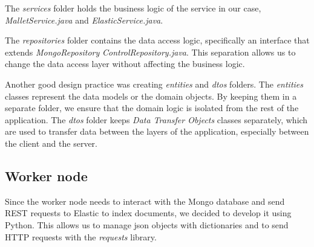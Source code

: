 The \textit{services} folder holds the business logic of the service in our case, \textit{MalletService.java} and \textit{ElasticService.java}.

The \textit{repositories} folder contains the data access logic, specifically an interface that extends
\textit{MongoRepository} \textit{ControlRepository.java}. This separation allows us to change the data access layer
without affecting the business logic.

Another good design practice was creating \textit{entities} and \textit{dtos} folders. The \textit{entities} classes
represent the data models or the domain objects. By keeping them in a separate folder, we ensure that the domain logic
is isolated from the rest of the application. The \textit{dtos} folder keeps \textit{Data Transfer Objects} classes
separately, which are used to transfer data between the layers of the application, especially between the client and the server.

\subsection{Worker node}
Since the worker node needs to interact with the Mongo database and send REST requests
to Elastic to index documents, we decided to develop it using Python.
This allows us to manage json objects with dictionaries and to send HTTP requests
with the \textit{requests} library.
